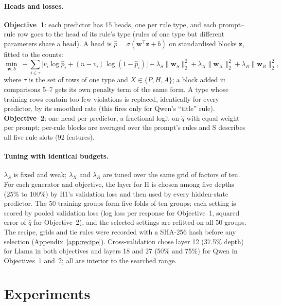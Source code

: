 \documentclass{article}
\newcommand{\qhat}{\hat{q}}
\newcommand{\blk}[1]{\textsf{#1}}
\begin{document}
\paragraph{Heads and losses.} \textbf{Objective~1}: each predictor has 15 heads, one per rule type, and each
prompt--rule row goes to the head of its rule's type (rules of one type but different parameters share a head). A head
is $\hat p=\sigma(\mathbf{w}^\top\mathbf{z}+b)$ on standardised blocks $\mathbf{z}$, fitted to the counts:
\begin{equation}
\min_{\mathbf{w},b}\;-\sum_{i\in\tau}\Big[v_i\log\hat p_i+(n-v_i)\log(1-\hat p_i)\Big]
+\lambda_S\lVert\mathbf{w}_S\rVert_2^2+\lambda_X\lVert\mathbf{w}_X\rVert_2^2+\lambda_R\lVert\mathbf{w}_R\rVert_2^2,
\label{eq:obj1}
\end{equation}
where $\tau$ is the set of rows of one type and $X\in\{P,H,A\}$; a block added in comparisons 5--7 gets
its own penalty term of the same form. A type whose training rows contain too few
violations is replaced, identically for every predictor, by its smoothed rate (this fires only for Qwen's ``title''
rule). \textbf{Objective~2}: one head per predictor, a fractional logit \citep{papke1996fractional} on $\qhat$ with
equal weight per prompt; per-rule blocks are averaged over the prompt's rules and \blk{S} describes all five rule
slots (92 features).

\paragraph{Tuning with identical budgets.} $\lambda_S$ is fixed and weak; $\lambda_X$ and $\lambda_R$ are tuned over
the same grid of factors of ten. For each generator
and objective, the layer for \blk{H} is chosen among five depths (25\% to 100\%) by H1's validation loss and then
used by every hidden-state predictor. The 50 training groups form five folds of ten groups; each setting is scored by
pooled validation loss (log loss per response for Objective~1, squared error of $\qhat$ for Objective~2), and the
selected settings are refitted on all 50 groups. The recipe, grids and tie rules were recorded with a SHA-256
hash before any selection (Appendix~\ref{app:recipe}). Cross-validation chose layer 12 (37.5\% depth) for Llama in both objectives and layers
18 and 27 (50\% and 75\%) for Qwen in Objectives~1 and~2; all are interior to the searched range.

\section{Experiments}
\label{sec:experiments}
\end{document}
